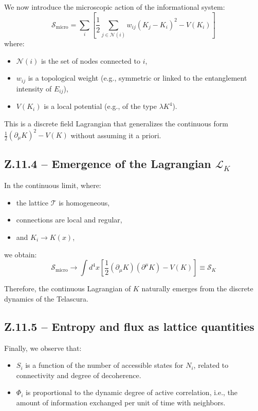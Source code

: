 \documentclass[12pt]{article}
\begin{document}
We now introduce the microscopic action of the informational system:
\[
\mathcal{S}_{\text{micro}} = \sum_{i} \left[ \frac{1}{2} \sum_{j \in \mathcal{N}(i)} w_{ij} (K_j - K_i)^2 - V(K_i) \right]
\]
where:
\begin{itemize}
  \item \( \mathcal{N}(i) \) is the set of nodes connected to \( i \),
  \item \( w_{ij} \) is a topological weight (e.g., symmetric or linked to the entanglement intensity of \( E_{ij} \)),
  \item \( V(K_i) \) is a local potential (e.g., of the type \(\lambda K^4\)).
\end{itemize}

This is a discrete field Lagrangian that generalizes the continuous form \( \frac{1}{2}(\partial_\mu K)^2 - V(K) \) without assuming it a priori.

\subsection*{Z.11.4 – Emergence of the Lagrangian \( \mathcal{L}_K \)}

In the continuous limit, where:
\begin{itemize}
  \item the lattice \(\mathcal{T}\) is homogeneous,
  \item connections are local and regular,
  \item and \( K_i \to K(x) \),
\end{itemize}
we obtain:
\[
\mathcal{S}_{\text{micro}} \to \int d^4x \left[ \frac{1}{2} (\partial_\mu K)(\partial^\mu K) - V(K) \right] \equiv \mathcal{S}_K
\]

Therefore, the continuous Lagrangian of \( K \) naturally emerges from the discrete dynamics of the Telascura.
\subsection*{Z.11.5 – Entropy and flux as lattice quantities}

Finally, we observe that:
\begin{itemize}
  \item \( S_i \) is a function of the number of accessible states for \( N_i \), related to connectivity and degree of decoherence.
  \item \( \Phi_i \) is proportional to the dynamic degree of active correlation, i.e., the amount of information exchanged per unit of time with neighbors.
\end{itemize}
\end{document}
